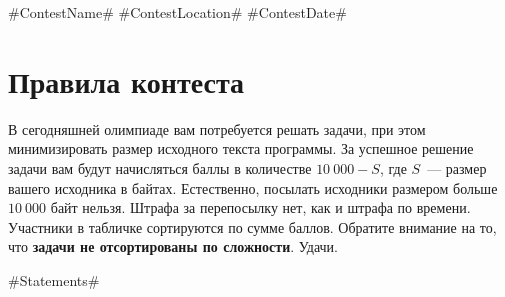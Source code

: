 \documentclass [11pt, a4paper, oneside] {article}
\begin{document}
\contest
{#ContestName#}%
{#ContestLocation#}%
{#ContestDate#}%


\renewcommand{\t}{\texttt}

\section*{Правила контеста}

В сегодняшней олимпиаде вам потребуется решать задачи, при этом минимизировать
размер исходного текста программы. За успешное решение задачи
вам будут начисляться баллы в количестве $10\ 000 - S$, где $S$~--- размер вашего
исходника в байтах.
Естественно, посылать исходники размером больше $10\ 000$ байт нельзя.
Штрафа за перепосылку нет, как и штрафа по времени.
Участники в табличке сортируются по сумме баллов.
Обратите внимание на то, что {\bf задачи не отсортированы по сложности}.
Удачи.

\newpage

#Statements#
\end{document}
